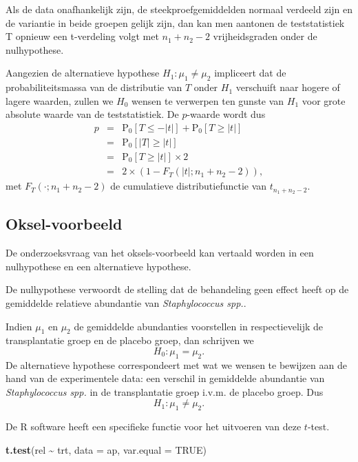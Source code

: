 \documentclass[
  12pt,dutch,coursenotes]{book}
\newenvironment{Shaded}{\begin{snugshade}}{\end{snugshade}}
\newcommand{\DataTypeTok}[1]{\textcolor[rgb]{0.13,0.29,0.53}{#1}}
\newcommand{\KeywordTok}[1]{\textcolor[rgb]{0.13,0.29,0.53}{\textbf{#1}}}
\newcommand{\NormalTok}[1]{#1}
\newcommand{\OperatorTok}[1]{\textcolor[rgb]{0.81,0.36,0.00}{\textbf{#1}}}
\newcommand{\OtherTok}[1]{\textcolor[rgb]{0.56,0.35,0.01}{#1}}
\newcommand{\StringTok}[1]{\textcolor[rgb]{0.31,0.60,0.02}{#1}}
\theoremstyle{definition}
\theoremstyle{definition}
\theoremstyle{definition}
\theoremstyle{remark}
\begin{document}
Als de data onafhankelijk zijn, de steekproefgemiddelden normaal verdeeld zijn en de variantie in beide groepen gelijk zijn, dan kan men aantonen de teststatistiek T opnieuw een t-verdeling volgt met \(n_1+n_2-2\) vrijheidsgraden onder de nulhypothese.

Aangezien de alternatieve hypothese \(H_1: \mu_1 \neq \mu_2\) impliceert dat de probabiliteitsmassa van de distributie van \(T\) onder \(H_1\) verschuift naar hogere of lagere waarden, zullen we \(H_0\) wensen te verwerpen ten gunste van \(H_1\) voor grote absolute waarde van de teststatistiek. De \(p\)-waarde wordt dus
\begin{eqnarray*}
  p&=&\text{P}_0\left[T\leq -|t|\right] + \text{P}_0\left[T\geq |t|\right]\\
  &=&\text{P}_0\left[\vert T\vert \geq \vert t \vert\right]\\
  &=&\text{P}_0\left[T \geq \vert t \vert\right]\times 2\\
  &=& 2\times(1-F_T(\vert t\vert;n_1+n_2-2)),
  \end{eqnarray*}
met \(F_T(\cdot;n_1+n_2-2)\) de cumulatieve distributiefunctie van \(t_{n_1+n_2-2}\).

\hypertarget{oksel-voorbeeld}{%
\subsection{Oksel-voorbeeld}\label{oksel-voorbeeld}}

De onderzoeksvraag van het oksels-voorbeeld kan vertaald worden in een nulhypothese en een alternatieve hypothese.

De nulhypothese verwoordt de stelling dat de behandeling geen effect heeft op de gemiddelde relatieve abundantie van \emph{Staphylococcus spp.}.

Indien \(\mu_1\) en \(\mu_2\) de gemiddelde abundanties voorstellen in respectievelijk de transplantatie groep en de placebo groep, dan schrijven we
\[   H_0: \mu_1=\mu_2.\]
De alternatieve hypothese correspondeert met wat we wensen te bewijzen aan de hand van de experimentele data: een verschil in gemiddelde abundantie van \emph{Staphylococcus spp.} in de transplantatie groep i.v.m. de placebo groep. Dus
\[H_1: \mu_1\neq \mu_2.\]

De R software heeft een specifieke functie voor het uitvoeren van deze \(t\)-test.

\begin{Shaded}
\begin{Highlighting}[]
\KeywordTok{t.test}\NormalTok{(rel }\OperatorTok{\textasciitilde{}}\StringTok{ }\NormalTok{trt, }\DataTypeTok{data =}\NormalTok{ ap, }\DataTypeTok{var.equal =} \OtherTok{TRUE}\NormalTok{)}
\end{Highlighting}
\end{Shaded}
\end{document}
